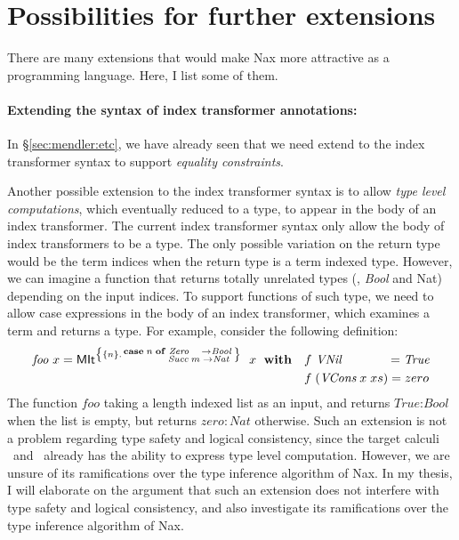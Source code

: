\section{Possibilities for further extensions}\label{sec:ext}
There are many extensions that would make Nax more attractive
as a programming language. Here, I list some of them.

\paragraph{Extending the syntax of index transformer annotations:}
In \S\ref{sec:mendler:etc}, we have already seen that we need extend
to the index transformer syntax to support
\emph{equality constraints}.

Another possible extension to the index transformer syntax is to allow
\emph{type level computations}, which eventually reduced to a type,
to appear in the body of an index transformer. The current index
transformer syntax only allow the body of index transformers to be a type.
The only possible variation on the return type would be the term indices
when the return type is a term indexed type. However, we can imagine
a function that returns totally unrelated types (\eg, \textit{Bool} and Nat)
depending on the input indices. To support functions of such type, we need
to allow case expressions in the body of an index transformer, which examines
a term and returns a type. For example, consider the following definition:
\begin{align*}
\textit{foo}~x =
 \textsf{MIt}^{\left\{\{n\} . \begin{smallmatrix}\textbf{case}\;n\;\textbf{of}
                                        &\textit{Zero}~~~  -> \textit{Bool} \\
                                        &\textit{Succ}\;m\;-> \textit{Nat}\;
                                        \end{smallmatrix}
       \right\}}~\;x~\;\textbf{with}
&\quad  f ~\textit{VNil}~~~~~~~~~~~ = \textit{True} \\
&\quad  f \;(\textit{VCons}\;x\;xs) = zero
\end{align*}
The function $foo$ taking a length indexed list as an input, and returns
$\textit{True} : \textit{Bool}$ when the list is empty, but returns
$zero : \textit{Nat}$ otherwise. Such an extension is not a problem regarding
type safety and logical consistency, since the target calculi \Fi\ and \Fixi\
already has the ability to express type level computation. However, we are
unsure of its ramifications over the type inference algorithm of Nax. In my
thesis, I will elaborate on the argument that such an extension does not
interfere with type safety and logical consistency, and also investigate
its ramifications over the type inference algorithm of Nax.

